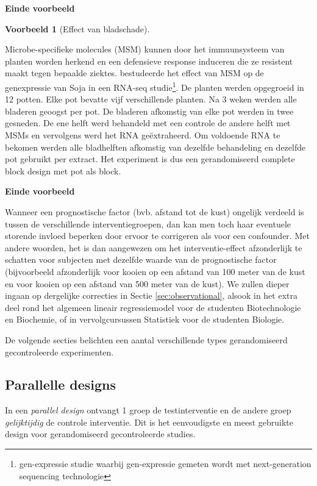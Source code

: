 \documentclass[
  12pt,dutch,coursenotes]{book}
\theoremstyle{definition}
\theoremstyle{definition}
\newtheorem{example}{Voorbeeld}[chapter]
\theoremstyle{definition}
\theoremstyle{definition}
\theoremstyle{remark}
\begin{document}
\textbf{Einde voorbeeld}

\begin{example}[Effect van bladschade]
\protect\hypertarget{exm:unnamed-chunk-74}{}{\label{exm:unnamed-chunk-74} {} }
\end{example}
Microbe-specifieke molecules (MSM) kunnen door het immuunsysteem van planten worden herkend en een defensieve response induceren die ze resistent maakt tegen bepaalde ziektes. \citet{Valdes2014} bestudeerde het effect van MSM op de genexpressie van Soja in een RNA-seq studie\footnote{gen-expressie studie waarbij gen-expressie gemeten wordt met next-generation sequencing technologie}. De planten werden opgegroeid in 12 potten. Elke pot bevatte vijf verschillende planten. Na 3 weken werden alle bladeren geoogst per pot. De bladeren afkomstig van elke pot werden in twee gesneden. De ene helft werd behandeld met een controle de andere helft met MSMs en vervolgens werd het RNA geëxtraheerd. Om voldoende RNA te bekomen werden alle bladhelften afkomstig van dezelfde behandeling en dezelfde pot gebruikt per extract. Het experiment is dus een gerandomiseerd complete block design met pot als block.

\textbf{Einde voorbeeld}

Wanneer een prognostische factor (bvb. afstand tot de kust) ongelijk verdeeld is
tussen de verschillende interventiegroepen, dan kan men toch haar eventuele
storende invloed beperken door ervoor te corrigeren als voor een confounder.
Met andere woorden, het is dan aangewezen om het interventie-effect
afzonderlijk te schatten voor subjecten met dezelfde waarde van de
prognostische factor (bijvoorbeeld afzonderlijk voor kooien op een afstand van 100 meter van de kust en voor kooien op een afstand van 500 meter van de kust). We zullen dieper ingaan op dergelijke correcties
in Sectie \ref{sec:observational}, alsook in het extra deel rond het algemeen lineair regressiemodel voor de studenten Biotechnologie en Biochemie, of in vervolgcursussen Statistiek voor de studenten Biologie.

De volgende secties belichten een aantal verschillende types gerandomiseerd
gecontroleerde experimenten.

\hypertarget{parallelle-designs}{%
\subsection{Parallelle designs}\label{parallelle-designs}}

In een \emph{parallel design} ontvangt 1 groep de testinterventie en de
andere groep \emph{gelijktijdig} de controle interventie. Dit is het
eenvoudigste en meest gebruikte design voor gerandomiseerd gecontroleerde
studies.
\end{document}
